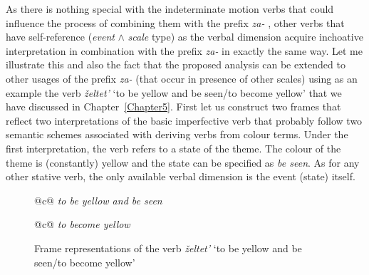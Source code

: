 As there is nothing special with the indeterminate motion verbs that could influence the process of combining them with the prefix \textit{za-}  , other verbs that have self-reference (\textit{event} $\wedge$ \textit{scale} type) as the verbal dimension acquire inchoative  interpretation in combination with the prefix \textit{za-}   in exactly the same way. Let me illustrate this and also the fact that the proposed analysis can be extended to other usages of the prefix \textit{za-}   (that occur in presence of other scales) using as an example the verb \textit{\v{z}eltet'} `to be yellow and be seen/to become yellow' that we have discussed in Chapter~\ref{Chapter5}. First let us construct two frames that reflect two interpretations of the basic imperfective verb  that probably follow two semantic schemes associated with deriving verbs from colour terms. Under the first interpretation, the verb refers to a state of the theme. The colour of the theme is (constantly) yellow and the state can be specified as \textit{be seen}. As for any other stative verb, the only available verbal dimension is the event (state) itself. 

\begin{figure}\small
\begin{tabular}[t]{@{}c@{}}
\textit{to be yellow and be seen}\\
\end{tabular}\hfill\begin{tabular}[t]{@{}c@{}}
\textit{to become yellow}\\
\end{tabular}
\caption{Frame representations of the verb \textit{\v{z}eltet'} `to be yellow and be seen/to become yellow' \label{frame:zeltet}}
\end{figure}

